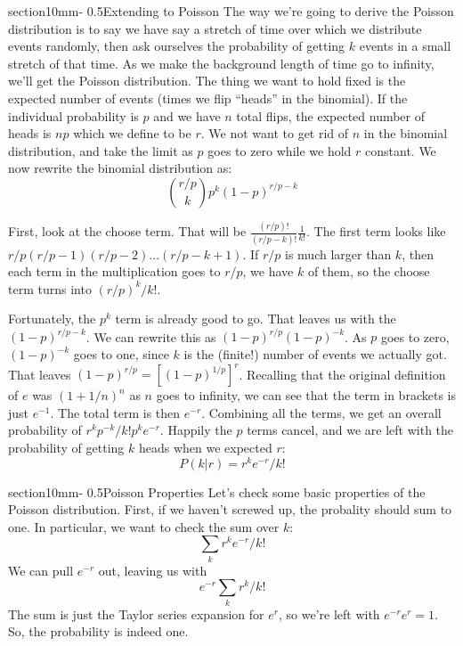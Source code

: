 \documentclass[letterpaper,11pt,preprint]{aastex}
\makeatletter
\renewcommand{\section}{\@startsection%
  {section}{1}{0mm}{-\baselineskip}%
  {0.5\baselineskip}{\normalfont\Large\bfseries}}%
\makeatother
\begin{document}
\section{Extending to Poisson}
The way we're going to derive the Poisson distribution is to say we
have say a stretch of time over which we distribute events randomly,
then ask ourselves the probability of getting $k$ events in a small
stretch of that time.  As we make the background length of time go to
infinity, we'll get the Poisson distribution.  The thing we want to
hold fixed is the expected number of events (times we flip ``heads''
in the binomial).  If the individual probability is $p$ and we have
$n$ total flips, the expected number of heads is $np$ which we define
to be $r$.  We not want to get rid of $n$ in the binomial
distribution, and take the limit as $p$ goes to zero while we hold $r$
constant.  We now rewrite the binomial distribution as:
$${r/p \choose k}p^k(1-p)^{r/p-k}$$

First, look at the choose term.  That will be
$\frac{(r/p)!}{(r/p-k)!}\frac{1}{k!}$.  The first term looks like
$r/p(r/p-1)(r/p-2)...(r/p-k+1)$.  If $r/p$ is much larger than $k$,
then each term in the multiplication goes to $r/p$, we have $k$ of
them, so the choose term turns into $(r/p)^k/k!$.

Fortunately, the $p^k$ term is already good to go.  That leaves us
with the $(1-p)^{r/p-k}$.  We can rewrite this as
$(1-p)^{r/p}(1-p)^{-k}$.  As $p$ goes to zero, $(1-p)^{-k}$ goes to
one, since $k$ is the (finite!) number of events we actually got.
That leaves $(1-p)^{r/p} = \left [ (1-p)^{1/p} \right ]^r$.  Recalling
that the original definition of $e$ was $(1+1/n)^n$ as $n$ goes to
infinity, we can see that the term in brackets is just $e^{-1}$.  The
total term is then $e^{-r}$.  Combining all the terms, we get an
overall probability of $r^kp^{-k}/k!p^ke^{-r}$.  Happily the $p$ terms
cancel, and we are left with the probability of getting $k$ heads when
we expected $r$:
$$P(k|r)=r^ke^{-r}/k!$$

\section{Poisson Properties}
Let's check some basic properties of the Poisson distribution.  First,
if we haven't screwed up, the probality should sum to one.  In
particular, we want to check the sum over $k$:
$$\sum_k r^ke^{-r}/k!$$
We can pull $e^{-r}$ out, leaving us with
$$e^{-r}\sum_k r^k/k!$$
The sum is just the Taylor series expansion for $e^{r}$, so we're left
with $e^{-r}e^r=1$.  So, the probability is indeed one.
\end{document}
